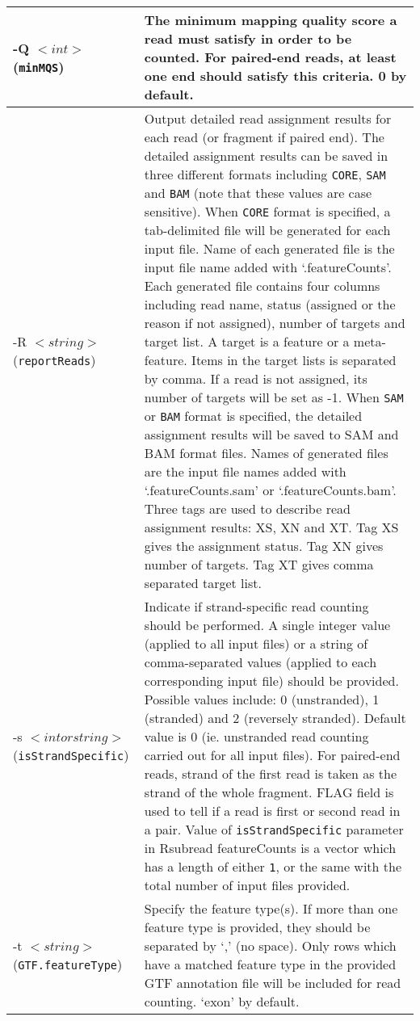 \documentclass[12pt]{report}
\newcommand{\code}[1]{{\small\texttt{#1}}}
\newcommand{\Rsubread}{\textsf{Rsubread}}
\newcommand{\featureCounts}{\textsf{featureCounts}}
\begin{document}
\begin{longtable}{|p{5cm}|p{11cm}|}
\hline
-Q $<int>$ \newline (\code{minMQS}) & The minimum mapping quality score a read must satisfy in order to be counted. For paired-end reads, at least one end should satisfy this criteria. 0 by default.\\
\hline
-R $<string>$ \newline (\code{reportReads}) & Output detailed read assignment results for each read (or fragment if paired end). The detailed assignment results can be saved in three different formats including \code{CORE}, \code{SAM} and \code{BAM} (note that these values are case sensitive). \newline When \code{CORE} format is specified, a tab-delimited file will be generated for each input file. Name of each generated file is the input file name added with `.featureCounts'.  Each generated file contains four columns including read name, status (assigned or the reason if not assigned), number of targets and target list. A target is a feature or a meta-feature. Items in the target lists is separated by comma. If a read is not assigned, its number of targets will be set as -1. \newline When \code{SAM} or \code{BAM} format is specified, the detailed assignment results will be saved to SAM and BAM format files. Names of generated files are the input file names added with `.featureCounts.sam' or `.featureCounts.bam'. Three tags are used to describe read assignment results: XS, XN and XT. Tag XS gives the assignment status. Tag XN gives number of targets. Tag XT gives comma separated target list. \\
\hline
-s $<int or string>$ \newline (\code{isStrandSpecific}) & Indicate if strand-specific read counting should be performed. A single integer value (applied to all input files) or a string of comma-separated values (applied to each corresponding input file) should be provided. Possible values include: 0 (unstranded), 1 (stranded) and 2 (reversely stranded). Default value is 0 (ie. unstranded read counting carried out for all input files). For paired-end reads, strand of the first read is taken as the strand of the whole fragment. FLAG field is used to tell if a read is first or second read in a pair. Value of \code{isStrandSpecific} parameter in {\Rsubread} {\featureCounts} is a vector which has a length of either {\code{1}}, or the same with the total number of input files provided. \\
\hline
-t $<string>$ \newline (\code{GTF.featureType}) & Specify the feature type(s). If more than one feature type is provided, they should be separated by `,' (no space). Only rows which have a matched feature type in the provided GTF annotation file will be included for read counting. `exon' by default.\\

\end{longtable}
\end{document}
